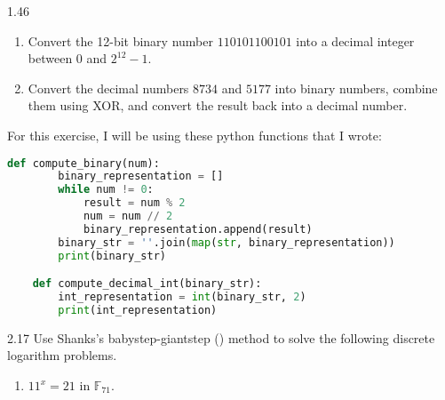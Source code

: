 \begin{exercise}
    {1.46}
    \begin{enumerate}
        \item Convert the 12-bit binary number \(110101100101\) into a decimal integer between \(0\) and \(2^{12} - 1\).
              \setcounter{enumi}{4}

        \item Convert the decimal numbers \(8734\) and \(5177\) into binary numbers, combine them using XOR, and convert the result back into a decimal number.
    \end{enumerate}
\end{exercise}

For this exercise, I will be using these python functions that I wrote:
\begin{lstlisting}[language=python]
    def compute_binary(num):
        binary_representation = []
        while num != 0:
            result = num % 2
            num = num // 2
            binary_representation.append(result)
        binary_str = ''.join(map(str, binary_representation))
        print(binary_str)

    def compute_decimal_int(binary_str):
        int_representation = int(binary_str, 2)
        print(int_representation)
\end{lstlisting}


\begin{exercise}
    {2.17} Use Shanks's babystep-giantstep () method to solve the following discrete logarithm problems.
    \begin{enumerate}
        \item \(11^x = 21\) in \(\mathbb{F}_{71}\).
    \end{enumerate}
\end{exercise}

